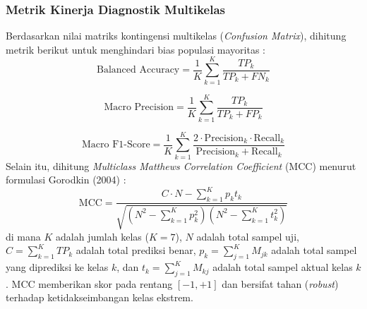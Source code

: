 \subsubsection{Metrik Kinerja Diagnostik Multikelas}
Berdasarkan nilai matriks kontingensi multikelas (\textit{Confusion Matrix}), dihitung metrik berikut untuk menghindari bias populasi mayoritas \cite{grandini2020metrics}:
\begin{equation}
	\text{Balanced Accuracy} = \frac{1}{K} \sum_{k=1}^{K} \frac{TP_k}{TP_k + FN_k}
\end{equation}

\begin{equation}
	\text{Macro Precision} = \frac{1}{K} \sum_{k=1}^{K} \frac{TP_k}{TP_k + FP_k}
\end{equation}

\begin{equation}
	\text{Macro F1-Score} = \frac{1}{K} \sum_{k=1}^{K} \frac{2 \cdot \text{Precision}_k \cdot \text{Recall}_k}{\text{Precision}_k + \text{Recall}_k}
\end{equation}
Selain itu, dihitung \textit{Multiclass Matthews Correlation Coefficient} (MCC) menurut formulasi Gorodkin (2004) \cite{gorodkin2004mcc}:
\begin{equation}
	\text{MCC} = \frac{C \cdot N - \sum_{k=1}^{K} p_k t_k}{\sqrt{\left(N^2 - \sum_{k=1}^{K} p_k^2\right) \left(N^2 - \sum_{k=1}^{K} t_k^2\right)}}
\end{equation}
di mana $K$ adalah jumlah kelas ($K=7$), $N$ adalah total sampel uji, $C = \sum_{k=1}^K TP_k$ adalah total prediksi benar, $p_k = \sum_{j=1}^K M_{jk}$ adalah total sampel yang diprediksi ke kelas $k$, dan $t_k = \sum_{j=1}^K M_{kj}$ adalah total sampel aktual kelas $k$. MCC memberikan skor pada rentang $[-1, +1]$ dan bersifat tahan (\textit{robust}) terhadap ketidakseimbangan kelas ekstrem.

